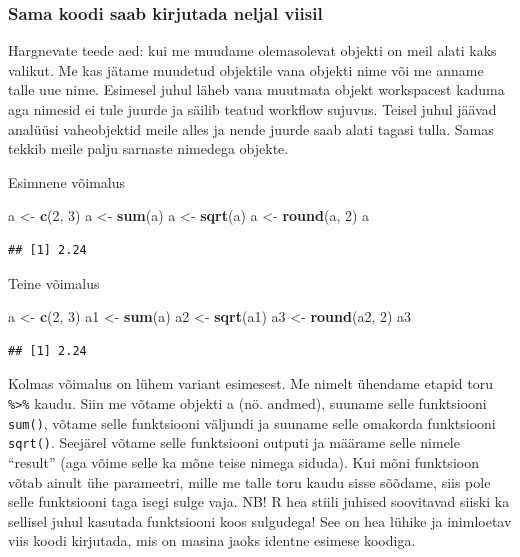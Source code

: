 \documentclass[]{book}
\newenvironment{Shaded}{\begin{snugshade}}{\end{snugshade}}
\newcommand{\KeywordTok}[1]{\textcolor[rgb]{0.13,0.29,0.53}{\textbf{#1}}}
\newcommand{\DecValTok}[1]{\textcolor[rgb]{0.00,0.00,0.81}{#1}}
\newcommand{\StringTok}[1]{\textcolor[rgb]{0.31,0.60,0.02}{#1}}
\newcommand{\NormalTok}[1]{#1}
\begin{document}
\subsubsection{Sama koodi saab kirjutada neljal
viisil}\label{sama-koodi-saab-kirjutada-neljal-viisil}

Hargnevate teede aed: kui me muudame olemasolevat objekti on meil alati
kaks valikut. Me kas jätame muudetud objektile vana objekti nime või me
anname talle uue nime. Esimesel juhul läheb vana muutmata objekt
workspacest kaduma aga nimesid ei tule juurde ja säilib teatud workflow
sujuvus. Teisel juhul jäävad analüüsi vaheobjektid meile alles ja nende
juurde saab alati tagasi tulla. Samas tekkib meile palju sarnaste
nimedega objekte.

Esimnene võimalus

\begin{Shaded}
\begin{Highlighting}[]
\NormalTok{a <-}\StringTok{ }\KeywordTok{c}\NormalTok{(}\DecValTok{2}\NormalTok{, }\DecValTok{3}\NormalTok{)}
\NormalTok{a <-}\StringTok{ }\KeywordTok{sum}\NormalTok{(a)}
\NormalTok{a <-}\StringTok{ }\KeywordTok{sqrt}\NormalTok{(a)}
\NormalTok{a <-}\StringTok{ }\KeywordTok{round}\NormalTok{(a, }\DecValTok{2}\NormalTok{)}
\NormalTok{a}
\end{Highlighting}
\end{Shaded}

\begin{verbatim}
## [1] 2.24
\end{verbatim}

Teine võimalus

\begin{Shaded}
\begin{Highlighting}[]
\NormalTok{a <-}\StringTok{ }\KeywordTok{c}\NormalTok{(}\DecValTok{2}\NormalTok{, }\DecValTok{3}\NormalTok{)}
\NormalTok{a1 <-}\StringTok{ }\KeywordTok{sum}\NormalTok{(a)}
\NormalTok{a2 <-}\StringTok{ }\KeywordTok{sqrt}\NormalTok{(a1)}
\NormalTok{a3 <-}\StringTok{ }\KeywordTok{round}\NormalTok{(a2, }\DecValTok{2}\NormalTok{)}
\NormalTok{a3}
\end{Highlighting}
\end{Shaded}

\begin{verbatim}
## [1] 2.24
\end{verbatim}

Kolmas võimalus on lühem variant esimesest. Me nimelt ühendame etapid
toru \texttt{\%\textgreater{}\%} kaudu. Siin me võtame objekti a (nö.
andmed), suuname selle funktsiooni \texttt{sum()}, võtame selle
funktsiooni väljundi ja suuname selle omakorda funktsiooni
\texttt{sqrt()}. Seejärel võtame selle funktsiooni outputi ja määrame
selle nimele ``result'' (aga võime selle ka mõne teise nimega siduda).
Kui mõni funktsioon võtab ainult ühe parameetri, mille me talle toru
kaudu sisse sõõdame, siis pole selle funktsiooni taga isegi sulge vaja.
NB! R hea stiili juhised soovitavad siiski ka sellisel juhul kasutada
funktsiooni koos sulgudega! See on hea lühike ja inimloetav viis koodi
kirjutada, mis on masina jaoks identne esimese koodiga.
\end{document}
